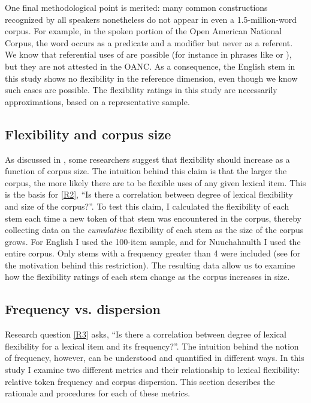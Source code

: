 One final methodological point is merited: many common constructions recognized by all speakers nonetheless do not appear in even a 1.5-million-word corpus. For example, in the spoken portion of the Open American National Corpus, the word  occurs as a predicate and a modifier but never as a referent. We know that referential uses of  are possible (for instance in phrases like  or ), but they are not attested in the OANC. As a consequence, the English stem  in this study shows no flexibility in the reference dimension, even though we know such cases are possible. The flexibility ratings in this study are necessarily approximations, based on a representative sample.

\subsection{Flexibility and corpus size}
\label{sec:3.4.2}

As discussed in , some researchers suggest that flexibility should increase as a function of corpus size. The intuition behind this claim is that the larger the corpus, the more likely there are to be flexible uses of any given lexical item. This is the basis for \ref{R2}, \enquote{Is there a correlation between degree of lexical flexibility and size of the corpus?}. To test this claim, I calculated the flexibility of each stem each time a new token of that stem was encountered in the corpus, thereby collecting data on the \emph{cumulative} flexibility of each stem as the size of the corpus grows. For English I used the 100-item sample, and for Nuuchahnulth I used the entire corpus. Only stems with a frequency greater than 4 were included (see  for the motivation behind this restriction). The resulting data allow us to examine how the flexibility ratings of each stem change as the corpus increases in size.

\subsection{Frequency vs. dispersion}
\label{sec:3.4.3}

Research question \ref{R3} asks, \enquote{Is there a correlation between degree of lexical flexibility for a lexical item and its frequency?}. The intuition behind the notion of frequency, however, can be understood and quantified in different ways. In this study I examine two different metrics and their relationship to lexical flexibility: relative token frequency and corpus dispersion. This section describes the rationale and procedures for each of these metrics.

